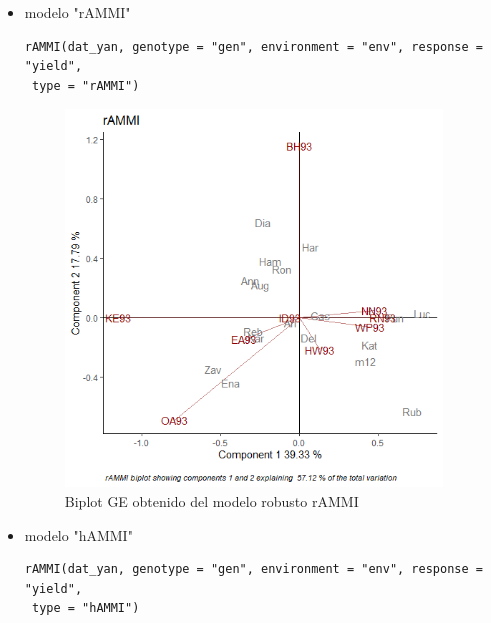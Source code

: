 \begin{itemize}

\item  modelo "rAMMI"

\begin{lstlisting}
rAMMI(dat_yan, genotype = "gen", environment = "env", response = "yield",
 type = "rAMMI")
\end{lstlisting}

\begin{figure}[h!]
	\begin{center}
		\includegraphics[width=10cm]{./Graficos/rAMMI.png}
	\end{center}
	\caption{Biplot GE obtenido del modelo robusto rAMMI}
\end{figure}


\item  modelo "hAMMI"

\begin{lstlisting}
rAMMI(dat_yan, genotype = "gen", environment = "env", response = "yield",
 type = "hAMMI")
\end{lstlisting}


\end{itemize}
